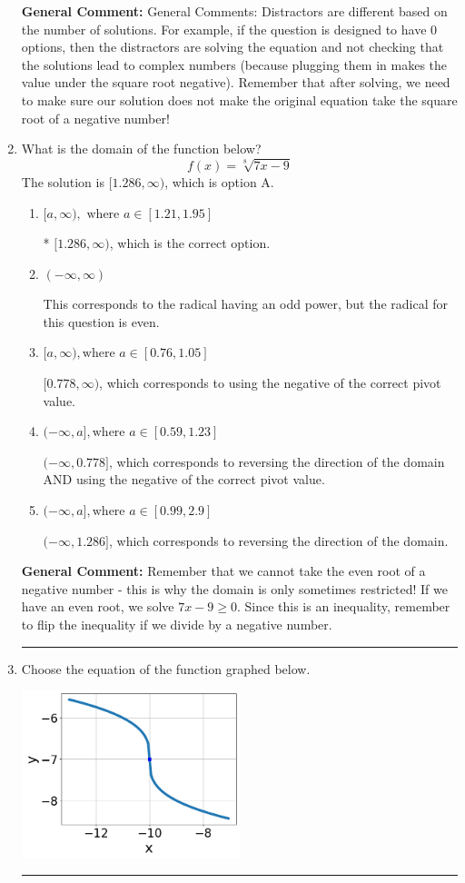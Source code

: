 \documentclass{extbook}[14pt]
\newcommand{\litem}[1]{\item #1

\rule{\textwidth}{0.4pt}}
\begin{document}
\begin{enumerate}
{\textbf{General Comment:} General Comments: Distractors are different based on the number of solutions. For example, if the question is designed to have 0 options, then the distractors are solving the equation and not checking that the solutions lead to complex numbers (because plugging them in makes the value under the square root negative). Remember that after solving, we need to make sure our solution does not make the original equation take the square root of a negative number!
}
\litem{
What is the domain of the function below?
\[ f(x) = \sqrt[8]{7 x - 9} \]The solution is \( [1.286, \infty) \), which is option A.\begin{enumerate}[label=\Alph*.]
\item \( [a, \infty), \text{ where } a \in [1.21, 1.95] \)

* $[1.286, \infty)$, which is the correct option.
\item \( (-\infty, \infty) \)

This corresponds to the radical having an odd power, but the radical for this question is even.
\item \( [a, \infty), \text{where } a \in [0.76, 1.05] \)

$[0.778, \infty)$, which corresponds to using the negative of the correct pivot value.
\item \( (-\infty, a], \text{where } a \in [0.59, 1.23] \)

$(-\infty, 0.778]$, which corresponds to reversing the direction of the domain AND using the negative of the correct pivot value.
\item \( (-\infty, a], \text{where } a \in [0.99, 2.9] \)

 $(-\infty, 1.286]$, which corresponds to reversing the direction of the domain.
\end{enumerate}

\textbf{General Comment:} Remember that we cannot take the even root of a negative number - this is why the domain is only sometimes restricted! If we have an even root, we solve $7 x - 9 \geq 0$. Since this is an inequality, remember to flip the inequality if we divide by a negative number.
}
\litem{
Choose the equation of the function graphed below.

\begin{center}
    \includegraphics[width=0.5\textwidth]{../Figures/radicalGraphToEquationA.png}
\end{center}


}
\end{enumerate}
\end{document}
